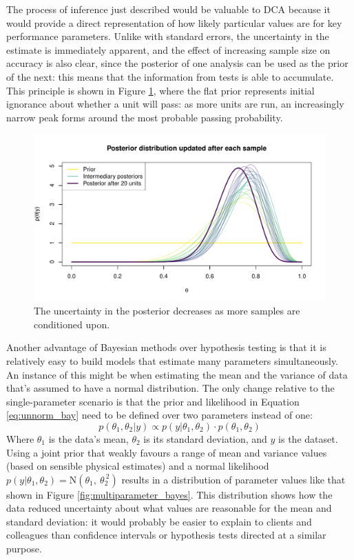 \documentclass[11pt,a4paper,article]{memoir} %
\begin{document}
The process of inference just described would be valuable to DCA because it would provide a direct representation of how likely particular values are for key performance parameters. Unlike with standard errors, the uncertainty in the estimate is immediately apparent, and the effect of increasing sample size on accuracy is also clear, since the posterior of one analysis can be used as the prior of the next: this means that the information from tests is able to accumulate. This principle is shown in Figure \ref{fig:updating_posterior}, where the flat prior represents initial ignorance about whether a unit will pass: as more units are run, an increasingly narrow peak forms around the most probable passing probability.
\begin{figure}
\includegraphics[width=\textwidth]{updating_posterior.pdf}
\caption{The uncertainty in the posterior decreases as more samples are conditioned upon.}
\label{fig:updating_posterior}
\end{figure}
\par

Another advantage of Bayesian methods over hypothesis testing is that it is relatively easy to build models that estimate many parameters simultaneously. An instance of this might be when estimating the mean and the variance of data that's assumed to have a normal distribution. The only change relative to the single-parameter scenario is that the prior and likelihood in Equation \ref{eq:unnorm_bay} need to be defined over two parameters instead of one:
\begin{equation}
	p(\theta_1, \theta_2 | y) \propto p(y|\theta_1, \theta_2) \cdot p(\theta_1, \theta_2)
\end{equation}
Where $\theta_1$ is the data's mean, $\theta_2$ is its standard deviation, and $y$ is the dataset. Using a joint prior that weakly favours a range of mean and variance values (based on sensible physical estimates) and a normal likelihood $p(y|\theta_1, \theta_2) = \text{N}(\theta_1, \ \theta_2^{\ 2})$ results in a distribution of parameter values like that shown in Figure \ref{fig:multiparameter_bayes}. This distribution shows how the data reduced uncertainty about what values are reasonable for the mean and standard deviation: it would probably be easier to explain to clients and colleagues than confidence intervals or hypothesis tests directed at a similar purpose.
\end{document}
